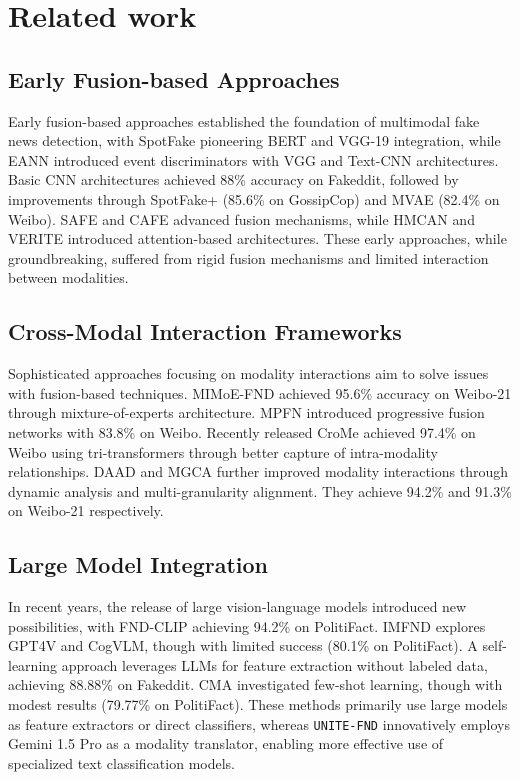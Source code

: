 \section{Related work}
\subsection{Early Fusion-based Approaches}
Early fusion-based approaches established the foundation of multimodal fake news detection, with SpotFake \cite{spotfake2019} pioneering BERT and VGG-19 integration, while EANN \cite{eann2018} introduced event discriminators with VGG and Text-CNN architectures. Basic CNN architectures \cite{basicmm2022} achieved 88\% accuracy on Fakeddit, followed by improvements through SpotFake+ \cite{spotfakeplus2020} (85.6\% on GossipCop) and MVAE \cite{mvae2019} (82.4\% on Weibo). SAFE \cite{safe2020} and CAFE \cite{cafe2021} advanced fusion mechanisms, while HMCAN \cite{hmcan2020} and VERITE \cite{verite2022} introduced attention-based architectures. These early approaches, while groundbreaking, suffered from rigid fusion mechanisms and limited interaction between modalities.

\subsection{Cross-Modal Interaction Frameworks}
Sophisticated approaches focusing on modality interactions aim to solve issues with fusion-based techniques. MIMoE-FND \cite{mimoe2025} achieved 95.6\% accuracy on Weibo-21 through mixture-of-experts architecture. MPFN \cite{mpfn2023} introduced progressive fusion networks with 83.8\% on Weibo. Recently released CroMe \cite{crome2025} achieved 97.4\% on Weibo using tri-transformers through better capture of intra-modality relationships. DAAD \cite{daad2024} and MGCA \cite{mgca2024} further improved modality interactions through dynamic analysis and multi-granularity alignment. They achieve 94.2\% and 91.3\% on Weibo-21 respectively.

\subsection{Large Model Integration}
In recent years, the release of large vision-language models introduced new possibilities,  with FND-CLIP \cite{fndclip2023} achieving 94.2\% on PolitiFact. IMFND \cite{imfnd2024} explores GPT4V and CogVLM, though with limited success (80.1\% on PolitiFact). A self-learning approach \cite{selflearning2024} leverages LLMs for feature extraction without labeled data, achieving 88.88\% on Fakeddit. CMA \cite{cma2024} investigated few-shot learning, though with modest results (79.77\% on PolitiFact). These methods primarily use large models as feature extractors or direct classifiers, whereas \texttt{UNITE-FND} innovatively employs Gemini 1.5 Pro as a modality translator, enabling more effective use of specialized text classification models.

